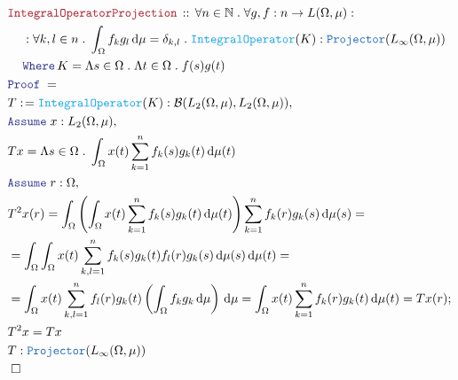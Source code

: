 \documentclass[12pt]{scrartcl}
\newcommand{\TYPE}[1]{\textcolor{NavyBlue}{\mathtt{#1}}}
\newcommand{\FUNC}[1]{\textcolor{Cerulean}{\mathtt{#1}}}
\newcommand{\LOGIC}[1]{\textcolor{Blue}{\mathtt{#1}}}
\newcommand{\THM}[1]{\textcolor{Maroon}{\mathtt{#1}}}
\renewcommand{\.}{\; . \;}
\newcommand{\de}{: \kern 0.1pc =}
\newcommand{\Theorem}[2]{& \THM{#1} \, :: \, #2 \\ & \Proof = \\ }
\newcommand{\NewLine}{\\ & \kern 1pc}
\newcommand{\Page}[1]{\begin{align*} #1 \end{align*} \newpage   }
\newcommand{\Nat}{\mathbb{N} }
\newcommand{\Say}[3]{& #1 \de #2 : #3, \\}
\newcommand{\A}{\LOGIC{Assume} \;}
\newcommand{\Assume}[2]{& \A #1 : #2, \\}
\newcommand{\QED}{\; \square}
\newcommand{\EndProof}{& \QED \\}
\newcommand{\Proof}{\LOGIC{Proof} \; }
\renewcommand{\O}{\Omega}
\newcommand{\B}{\mathcal{B}}
\begin{document}
    \Page{
    \Theorem{IntegralOperatorProjection}{\forall  n \in \Nat \. \forall g,f : n \to L(\O,\mu) 
     : \NewLine 
     : \forall k,l \in n \. \int_\O f_k g_l \, \mathrm{d}\mu 
     = \delta_{k,l} \.
       \FUNC{IntegralOperator}(K) : \TYPE{Projector}(L_\infty(\O,\mu))
       \NewLine
       \LOGIC{Where} \, K = \Lambda s \in \O \. \Lambda t \in \O \. f(s)g(t)
        }
  \Say{T}{\FUNC{IntegralOperator}(K)}{\B(L_2(\O,\mu),L_2(\O,\mu))}
  \Assume{x}{ L_2(\O,\mu)}
  &  Tx  =  \Lambda s \in \O  \.\int_\O x(t) \sum^n_{k = 1}f_k(s)g_k(t) \, \mathrm{d}\mu(t)    \\  
  \Assume{r}{\O}
  &  T^2 x(r) = \int_\O \left( \int_\O x(t) \sum^n_{k = 1}f_k(s)g_k(t) \, \mathrm{d}\mu(t)
   \right)
     \sum^n_{k = 1} f_k(r) g_k(s) \, \mathrm{d}\mu(s)  =
   \\ 
  & = \int_\O \int_\O x(t) \sum^n_{k,l = 1} f_k(s)g_k(t)f_l(r)g_k(s) \, \mathrm{d}\mu(s) \, \mathrm{d}\mu(t) = \\
  & =    \int_\O  x(t)  \sum^n_{k,l = 1} f_{l}(r) g_k(t) \left( \int_\O
    f_k g_k
    \,  \mathrm{d} \mu\right) \, \mathrm{d} \mu = 
    \int_\O x(t) \sum^n_{k = 1}f_k(r)g_k(t) \, \mathrm{d}\mu(t) = Tx(r);
     \\
  & T^2x = Tx \\
  & T :  \TYPE{Projector}(L_\infty(\O,\mu)) \\
  \EndProof
    }
\end{document}
